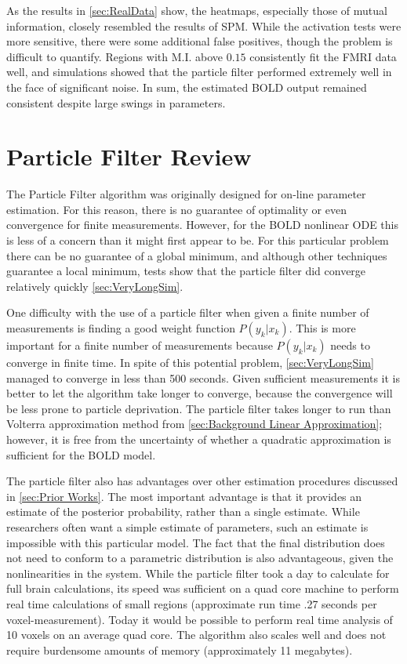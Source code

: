 As the results in \autoref{sec:RealData} show, the heatmaps, especially
those of mutual information, closely resembled the results of SPM. While the activation
tests were more sensitive, there were some additional false positives, 
though the problem is difficult to quantify. Regions with M.I. above 
$0.15$ consistently fit the FMRI data well, and simulations showed that
the particle filter performed extremely well in the face of significant
noise. In sum, the estimated BOLD output remained consistent despite
large swings in parameters.

\section{Particle Filter Review}
The Particle Filter algorithm was originally designed for on-line parameter 
estimation. For this reason, there is no guarantee of optimality or even 
convergence for finite measurements. However, for the BOLD nonlinear ODE 
this is less of a concern than it might first appear to be. For this
particular problem there can be no guarantee of a global minimum, and although
other techniques guarantee a local minimum, tests show that the particle
filter did converge relatively quickly \autoref{sec:VeryLongSim}.

One difficulty
with the use of a particle filter when given a finite number of measurements is finding
a good weight function $P(y_k | x_k)$. This is more important for a finite
number of measurements because $P(y_k | x_k)$ needs to converge in finite time.
In spite of this potential problem, \autoref{sec:VeryLongSim} managed
to converge in less than 500 seconds.  Given sufficient
measurements it is better to let the algorithm take longer to converge, because the
convergence will be less prone to particle deprivation. The particle filter takes longer
to run than Volterra approximation method from \autoref{sec:Background Linear Approximation};
however, it is free from the uncertainty of whether a quadratic approximation is 
sufficient for the BOLD model. 

The particle filter also has advantages over other estimation procedures
discussed in \autoref{sec:Prior Works}. The most important advantage is that it provides
an estimate of the posterior probability, rather than a single estimate. While researchers
often want a simple estimate of parameters, such an estimate is impossible with this particular
model. The fact that the final distribution does not need to conform to a
parametric distribution is also advantageous, given the nonlinearities in the system.
While the particle filter took a day to calculate for full brain calculations, its speed
was sufficient on a quad core machine to perform real time calculations of small regions
(approximate run time .27 seconds per voxel-measurement). Today it would be possible
 to perform real time analysis of 10 voxels on an average quad core. The algorithm also scales
well and does not require burdensome amounts of memory (approximately 11 megabytes). 

